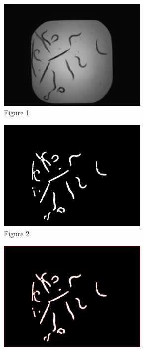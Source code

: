 \documentclass[a4paper,12pt]{article}
\begin{document}
\begin{figure}[ht!]
    \centering
    \begin{subfigure}{0.5\textwidth}
        \centering
        \includegraphics[width=0.8\textwidth]{A01_step0.jpg}
        \captionsetup{labelformat=empty}
        \caption{Figure 1}
    \end{subfigure}%
    \begin{subfigure}{0.5\textwidth}
        \centering
        \includegraphics[width=0.8\textwidth]{A01_step1.jpg}
        \captionsetup{labelformat=empty}
        \caption{Figure 2}
    \end{subfigure}
    \begin{subfigure}{0.5\textwidth}
        \centering
        \includegraphics[width=0.8\textwidth]{A01_step2.jpg}

\end{subfigure}
\end{figure}
\end{document}
